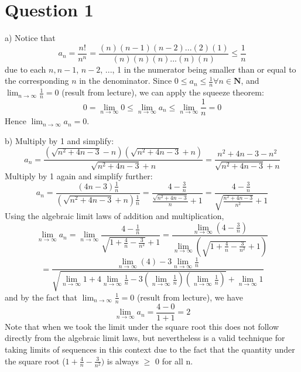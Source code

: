\documentclass[12pt]{article}
\renewcommand{\=}[1]{\stackrel{#1}{=}} %
\theoremstyle{definition}
\begin{document}
\pagestyle{empty}
\section*{Question 1}\Large
\quad a) Notice that $$a_n = \frac{n!}{n^n}= \frac{(n)(n-1)(n-2)...(2)(1)}{(n)(n)(n)...(n)(n)}\leq \frac{1}{n}$$ due to each $n, n-1$, $n - 2$, ..., 1 in the numerator being smaller than or equal to the corresponding $n$ in the denominator. Since $0 \leq a_n \leq \frac{1}{n}\forall n\in \textbf{N}$, and $\lim_{n\to\infty}\frac{1}{n} = 0$ (result from lecture), we can apply the squeeze theorem: $$0 = \lim_{n\to\infty}0 \leq \lim_{n\to\infty}a_n \leq \lim_{n\to\infty}\frac{1}{n} = 0$$ Hence $\lim_{n\to\infty}a_n = 0$.

b) Multiply by 1 and simplify:
$$a_n = \frac{(\sqrt{n^2+4n-3} - n)(\sqrt{n^2+4n-3} + n)}{\sqrt{n^2+4n-3} + n} = \frac{n^2 + 4n - 3 - n^2}{\sqrt{n^2+4n-3} + n}$$
Multiply by 1 again and simplify further: $$a_n = \frac{(4n - 3)\frac{1}{n}}{(\sqrt{n^2+4n-3} + n)\frac{1}{n}} = \frac{4 - \frac{3}{n}}{\frac{\sqrt{n^2+4n-3}}{n} +1} = \frac{4 - \frac{3}{n}}{\sqrt{\frac{n^2+4n-3}{n^2}} +1}$$Using the algebraic limit laws of addition and multiplication, $$\lim_{n\to\infty}a_n = \lim_{n\to\infty}\frac{4 - \frac{1}{n}}{\sqrt{1 + \frac{4}{n} - \frac{3}{n^2}} +1} = \frac{\lim_{n\to\infty}(4 - \frac{3}{n})}{\lim_{n\to\infty}(\sqrt{1 + \frac{4}{n} - \frac{3}{n^2}} +1)}$$$$= \frac{\lim_{n\to\infty}(4) - 3\lim_{n\to\infty}\frac{1}{n}}{\sqrt{\lim_{n\to\infty}1 + 4\lim_{n\to\infty}\frac{1}{n} - 3(\lim_{n\to\infty}\frac{1}{n})(\lim_{n\to\infty}\frac{1}{n})} + \lim_{n\to\infty}1}$$and by the fact that $\lim_{n\to\infty}\frac{1}{n}=0$ (result from lecture), we have $$\lim_{n\to\infty}a_n = \frac{4 - 0}{1 + 1} = 2$$ Note that when we took the limit under the square root this does not follow directly from the algebraic limit laws, but nevertheless is a valid technique for taking limits of sequences in this context due to the fact that the quantity under the square root ($1 + \frac{4}{n} - \frac{3}{n^2})$ is always $\geq$ 0 for all n.
\end{document}
